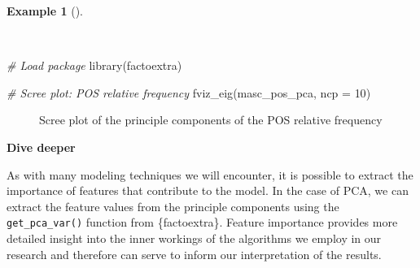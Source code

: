 \documentclass[
  letterpaper,
  krantz1]{latex/krantz-mod}
\newenvironment{Shaded}{\begin{snugshade}}{\end{snugshade}}
\newcommand{\AttributeTok}[1]{\textcolor[rgb]{0.00,0.00,0.00}{#1}}
\newcommand{\CommentTok}[1]{\textcolor[rgb]{0.00,0.00,0.00}{\textit{#1}}}
\newcommand{\DecValTok}[1]{\textcolor[rgb]{0.00,0.00,0.00}{#1}}
\newcommand{\FunctionTok}[1]{\textcolor[rgb]{0.00,0.00,0.00}{#1}}
\newcommand{\NormalTok}[1]{\textcolor[rgb]{0.00,0.00,0.00}{#1}}
\theoremstyle{definition}
\newtheorem{example}{Example}[chapter]
\theoremstyle{definition}
\theoremstyle{remark}
\begin{document}
\begin{example}[]\protect\hypertarget{exm-explore-masc-dtms-pca-scree}{}\label{exm-explore-masc-dtms-pca-scree}

~

\begin{Shaded}
\begin{Highlighting}[numbers=left,,]
\CommentTok{\# Load package}
\FunctionTok{library}\NormalTok{(factoextra)}

\CommentTok{\# Scree plot: POS relative frequency}
\FunctionTok{fviz\_eig}\NormalTok{(masc\_pos\_pca, }\AttributeTok{ncp =} \DecValTok{10}\NormalTok{)}
\end{Highlighting}
\end{Shaded}

\begin{figure}[!htb]


\caption{\label{fig-explore-masc-dtms-pca-scree}Scree plot of the
principle components of the POS relative frequency}

\end{figure}%

\end{example}

\pagebreak

\begin{tcolorbox}[enhanced jigsaw, leftrule=.75mm, colframe=quarto-callout-color-frame, left=2mm, colback=white, toprule=.15mm, breakable, arc=.35mm, opacityback=0, bottomrule=.15mm, rightrule=.15mm]

\textbf{ Dive deeper}

As with many modeling techniques we will encounter, it is possible to
extract the importance of features that contribute to the model. In the
case of PCA, we can extract the feature values from the principle
components using the \texttt{get\_pca\_var()} function from
\{factoextra\}. Feature importance provides more detailed insight into
the inner workings of the algorithms we employ in our research and
therefore can serve to inform our interpretation of the results.

\end{tcolorbox}
\end{document}
